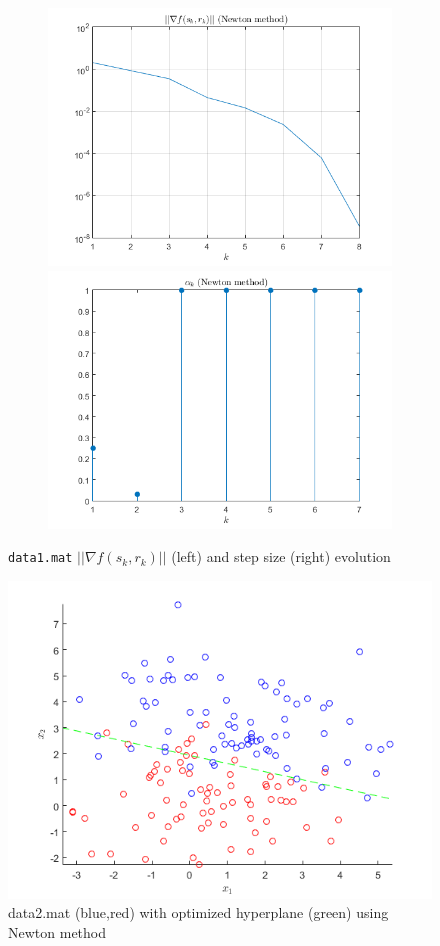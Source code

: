 \begin{figure}[H]
    \label{fig:pt2task6:data1}
    \begin{subfigure}
        \centering
        \includegraphics[width=0.45\linewidth]{part2/figures/T6_Norm_data1.png}\hspace{0em}
        \includegraphics[width=0.45\linewidth]{part2/figures/T6_stepsize_data1.png}
       
    \end{subfigure}
    \caption{\texttt{data1.mat} $||\nabla{f(s_k,r_k)}||$ (left) and step size (right) evolution}
\end{figure}

\begin{figure}[H]
\label{fig:pt2task6:data2line}
        \centering
        \includegraphics[width=0.5\linewidth]{part2/figures/T6_Line_data2.png}
          \caption{data2.mat (blue,red) with optimized hyperplane (green) using Newton method}
\end{figure}

